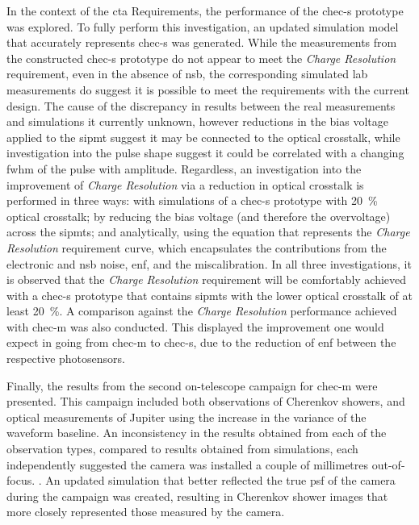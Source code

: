 In the context of the \gls{cta} Requirements, the performance of the \gls{chec-s} prototype was explored. To fully perform this investigation, an updated simulation model that accurately represents \gls{chec-s} was generated. While the measurements from the constructed \gls{chec-s} prototype do not appear to meet the \textit{Charge Resolution} requirement, even in the absence of \gls{nsb}, the corresponding simulated lab measurements do suggest it is possible to meet the requirements with the current design. The cause of the discrepancy in results between the real measurements and simulations it currently unknown, however reductions in the bias voltage applied to the \gls{sipmt} suggest it may be connected to the optical crosstalk, while investigation into the pulse shape suggest it could be correlated with a changing \gls{fwhm} of the pulse with amplitude. Regardless, an investigation into the improvement of \textit{Charge Resolution} via a reduction in optical crosstalk is performed in three ways: with simulations of a \gls{chec-s} prototype with \SI{20}{\percent} optical crosstalk; by reducing the bias voltage (and therefore the overvoltage) across the \glspl{sipmt}; and analytically, using the equation that represents the \textit{Charge Resolution} requirement curve, which encapsulates the contributions from the electronic and \gls{nsb} noise, \gls{enf}, and the miscalibration. In all three investigations, it is observed that the \textit{Charge Resolution} requirement will be comfortably achieved with a \gls{chec-s} prototype that contains \glspl{sipmt} with the lower optical crosstalk of at least \SI{20}{\percent}. A comparison against the \textit{Charge Resolution} performance achieved with \gls{chec-m} was also conducted. This displayed the improvement one would expect in going from \gls{chec-m} to \gls{chec-s}, due to the reduction of \gls{enf} between the respective photosensors.

Finally, the results from the second on-telescope campaign for \gls{chec-m} were presented. This campaign included both observations of Cherenkov showers, and optical measurements of Jupiter using the increase in the variance of the waveform baseline. An inconsistency in the results obtained from each of the observation types, compared to results obtained from simulations, each independently suggested the camera was installed a couple of millimetres out-of-focus. . An updated simulation that better reflected the true \gls{psf} of the camera during the campaign was created, resulting in Cherenkov shower images that more closely represented those measured by the camera. 
 
